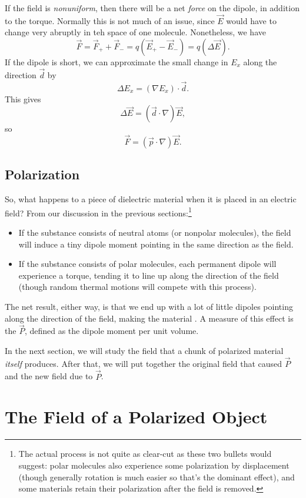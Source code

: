If the field is \textit{nonuniform}, then there will be a net \textit{force} on the dipole, in addition to the torque. Normally this is not much of an issue, since $\vec{E}$ would have to change very abruptly in teh space of one molecule. Nonetheless, we have
\[\vec{F}=\vec{F}_++\vec{F}_-=q(\vec{E}_+-\vec{E}_-)=q(\Delta \vec{E}).\]
If the dipole is short, we can approximate the small change in $E_x$ along the direction $\vec{d}$ by
\[\Delta E_x=(\nabla E_x)\cdot \vec{d}.\]
This gives
\[\Delta\vec{E}=(\vec{d}\cdot \nabla)\vec{E},\]
so
\[\vec{F}=(\vec{p}\cdot \nabla)\vec{E}.\]

\subsection{Polarization}

So, what happens to a piece of dielectric material when it is placed in an electric field? From our discussion in the previous sections:\footnote{The actual process is not quite as clear-cut as these two bullets would suggest: polar molecules also experience some polarization by displacement (though generally rotation is much easier so that's the dominant effect), and some materials retain their polarization after the field is removed.}
\begin{itemize}
    \item If the substance consists of neutral atoms (or nonpolar molecules), the field will induce a tiny dipole moment pointing in the same direction as the field.
    \item If the substance consists of polar molecules, each permanent dipole will experience a torque, tending it to line up along the direction of the field (though random thermal motions will compete with this process).
\end{itemize}
The net result, either way, is that we end up with a lot of little dipoles pointing along the direction of the field, making the material . A measure of this effect is the  $\vec{P}$, defined as the dipole moment per unit volume.

In the next section, we will study the field that a chunk of polarized material \textit{itself} produces. After that, we will put together the original field that caused $\vec{P}$ and the new field due to $\vec{P}$.

\section{The Field of a Polarized Object}

